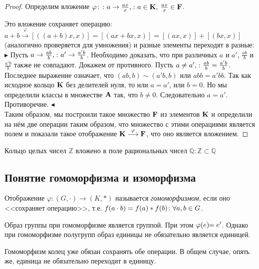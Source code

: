 \begin{proof}
Определим вложение $\varphi\colon\colon a\rightarrow\frac{ax}{x},\colon a\in\mathbf{K},\:\frac{ax}{x}\in\mathbf{F}$.

Это вложение сохраняет операцию: $a+b\stackrel{\varphi}{\longrightarrow} [((a+b)x,x)] =[(ax+bx, x)]=[(ax,x)] + [(bx,x)]$ (аналогично проверяется для умножения) и разные элементы переходят в разные:\\

$\blacktriangleright$ Пусть $a \to \frac{ab}{b},\colon a'\to \frac{a'b}{b}$. Необходимо доказать, что при различных $a$ и $a'$, $\frac{ab}{b}$ и $\frac{a'b}{b}$ также не совпадают. Докажем от противного. Пусть $a\ne a',\colon \frac{ab}{b}=\frac{a'b}{b}$. Последнее выражение означает, что $(ab,b)\sim(a'b,b)$ или $abb=a'bb$. Так как исходное кольцо $\mathbf{K}$ без делителей нуля, то или $a=a'$, или $b=0$. Но мы определили классы в множестве $\mathbf{A}$ так, что $b\ne 0$. Следовательно $a=a'$. Противоречие. $\blacktriangleleft$\\

Таким образом, мы построили такое множество $\mathbf{F}$ из элементов $\mathbf{K}$ и определили на нём две операции таким образом, что множество с этими операциями является полем и показали такое отображение $\mathbf{K} \stackrel{\varphi}{\longrightarrow} \mathbf{F}$, что оно является вложением.
\end{proof}

\begin{ex}
Кольцо целых чисел $\mathbb Z$ вложено в поле рациональных чисел $\mathbb Q\colon\mathbb Z \subset \mathbb Q$
\end{ex}

\subsection{Понятие гомоморфизма и изоморфизма}

\begin{df}
Отображение $\varphi\colon (G,\cdot)\to(K,*)$ называется \emph{гомоморфизмом}, если оно <<сохраняет операцию>>, т.е. $f(a\cdot b)=f(a)*f(b)\colon\forall a,b\in G$.
\end{df}

\begin{stm}
  Образ группы при гомоморфизме является группой. При этом $\varphi(e)\!\!\bw=e'$. Однако при гомоморфизме полугрупп образ единицы не обязательно является единицей.
\end{stm}

Гомоморфизм колец уже обязан сохранять обе операции. В общем случае, опять же, единица не обязательно переходит в единицу.

